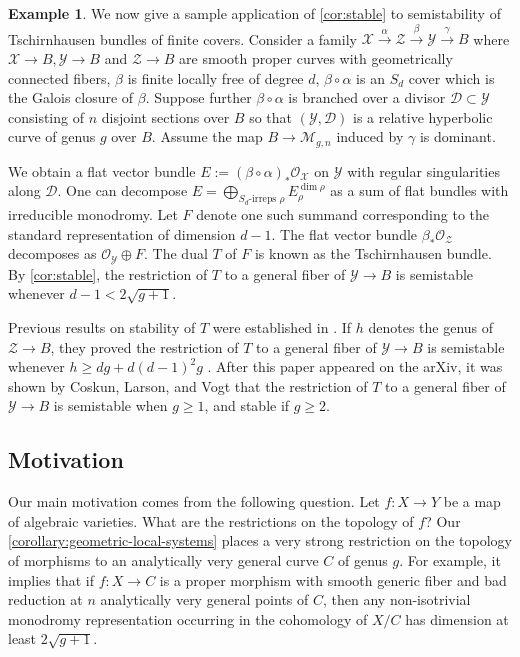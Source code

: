 \documentclass[12 pt]{amsart}
\theoremstyle{plain}
\theoremstyle{definition}
\newtheorem{example}[subsubsection]{Example}
\theoremstyle{remark}
\numberwithin{equation}{section}
\begin{document}
\begin{example}
	\label{example:tschirnhausen}
	We now give a sample application of \autoref{cor:stable} to
	semistability of Tschirnhausen bundles of finite covers.
	Consider a family $\mathscr X \xrightarrow{\alpha} \mathscr{Z}
	\xrightarrow{\beta} \mathscr Y
	\xrightarrow{\gamma} B$
	where $\mathscr X \to B, \mathscr Y \to B$ and $\mathscr Z \to B$ are smooth proper curves
	with geometrically connected fibers,
	$\beta$ is finite locally free of degree $d$, $\beta\circ \alpha$ is an $S_d$ cover
	which is the Galois closure of $\beta$. 
	Suppose further $\beta \circ \alpha$ is branched
	over a divisor $\mathscr D \subset \mathscr Y$ consisting of $n$ disjoint sections over $B$ so that
	$(\mathscr Y, \mathscr D)$ is a relative hyperbolic curve of genus $g$ over $B$.
	Assume the map $B \to \mathscr M_{g,n}$ induced by $\gamma$
	is dominant.

	We obtain a flat vector bundle $E := (\beta \circ \alpha)_* \mathscr
	O_{\mathscr X}$ on $\mathscr Y$ with regular singularities along
	$\mathscr D$.
	One can decompose $E = \bigoplus\limits_{S_d \text{-irreps }
	\rho} E_\rho^{\dim \rho}$ as a sum of flat bundles with irreducible
	monodromy. Let $F$ denote one such
	summand corresponding to the standard representation of dimension $d-1$. 
	The flat vector bundle $\beta_* \mathscr O_{\mathscr Z}$ decomposes as
	$\mathscr O_{\mathscr Y} \oplus F$.
	The dual $T$ of $F$ is known
	as the Tschirnhausen bundle.
	By \autoref{cor:stable},
	the restriction of $T$ to a general fiber of $\mathscr Y \to B$
	is semistable whenever $d -1 < 2 \sqrt{g+1}$.

	Previous results on stability of $T$ were established in 
	\cite[Theorem 1.5]{deopurkarP:vector-bundles-and-finite-covers}.
	If $h$ denotes the genus of $\mathscr Z \to B$, they proved the
	restriction of $T$ to a general fiber of $\mathscr Y \to B$ is
	semistable whenever $h \geq dg + d(d-1)^2 g$
	\cite[Remark 3.16]{deopurkarP:vector-bundles-and-finite-covers}. After this paper appeared on the arXiv, it was shown by Coskun, Larson, and Vogt \cite{coskun2022stability} that the restriction of $T$ to a general fiber of $\mathscr Y \to B$
	is semistable when $g\geq 1$, and stable if $g\geq 2$.
\end{example}



\subsection{Motivation}
 Our main motivation comes from the following question. Let $f: X\to Y$ be a map
 of algebraic varieties. What are the restrictions on the topology of $f$? Our
 \autoref{corollary:geometric-local-systems} places a very strong restriction on
 the topology of morphisms to an analytically very general curve $C$ of genus
 $g$. For example, it implies that if $f: X\to C$ is a proper morphism with smooth generic fiber and bad reduction at $n$ analytically very general points of $C$, then any non-isotrivial monodromy representation occurring in the cohomology of $X/C$ has dimension at least $2\sqrt{g+1}$.
 
\end{document}

